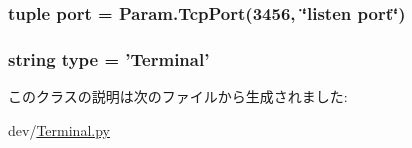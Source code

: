 \label{classTerminal_1_1Terminal_acf316e258896197f4e917a6547e49532}
\hypertarget{classTerminal_1_1Terminal_a1aadf525515ecfcf662c2aa51a503763}{
\subsubsection[{port}]{\setlength{\rightskip}{0pt plus 5cm}tuple {\bf port} = Param.TcpPort(3456, \char`\"{}listen {\bf port}\char`\"{})}}
\label{classTerminal_1_1Terminal_a1aadf525515ecfcf662c2aa51a503763}
\hypertarget{classTerminal_1_1Terminal_acce15679d830831b0bbe8ebc2a60b2ca}{
\subsubsection[{type}]{\setlength{\rightskip}{0pt plus 5cm}string {\bf type} = '{\bf Terminal}'}}
\label{classTerminal_1_1Terminal_acce15679d830831b0bbe8ebc2a60b2ca}


このクラスの説明は次のファイルから生成されました:\begin{DoxyCompactItemize}
\item 
dev/\hyperlink{Terminal_8py}{Terminal.py}\end{DoxyCompactItemize}
